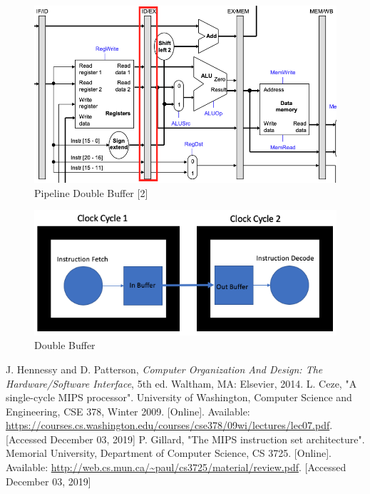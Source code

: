 \documentclass[conference]{IEEEtran}
\begin{document}
\begin{figure}
    \centering
    \includegraphics[scale=.3]{pipeline_double_buffer.png}
    \caption{Pipeline Double Buffer [2]}
    \label{fig:pipeline_double_buffer}
\end{figure}

\begin{figure}
    \centering
    \includegraphics[scale=.3]{double_buffer.png}
    \caption{Double Buffer}
    \label{fig:double_buffer}
\end{figure}

\begin{thebibliography}{00}
 J. Hennessy and D. Patterson, \textit{Computer Organization And Design: The Hardware/Software Interface}, 5th ed. Waltham, MA: Elsevier, 2014.
 L. Ceze, "A single-cycle MIPS processor". University of Washington, Computer Science and Engineering, CSE 378, Winter 2009. [Online]. Available: \url{https://courses.cs.washington.edu/courses/cse378/09wi/lectures/lec07.pdf}. [Accessed December 03, 2019]
 P. Gillard, "The MIPS instruction set architecture". Memorial University, Department of Computer Science, CS 3725. [Online]. Available: \url{http://web.cs.mun.ca/~paul/cs3725/material/review.pdf}. [Accessed December 03, 2019]
\end{thebibliography}
\end{document}
